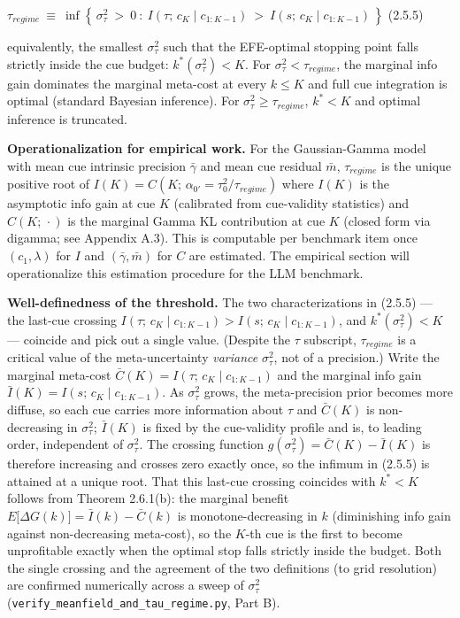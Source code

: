 \documentclass{article}
\begin{document}
\(\tau_{regime}\  \equiv \ \inf\left\{ \,\sigma_{\tau}^{2}\  > \ 0\ :\ I(\tau;\, c_{K} \mid c_{1:K - 1})\  > \ I(s;\, c_{K} \mid c_{1:K - 1})\, \right\}\)
(2.5.5)

equivalently, the smallest \(\sigma_{\tau}^{2}\) such that the
EFE-optimal stopping point falls strictly inside the cue budget:
\(k^{*}(\sigma_{\tau}^{2}) < K\). For
\(\sigma_{\tau}^{2} < \tau_{regime}\), the marginal info gain dominates
the marginal meta-cost at every \(k \leq K\) and full cue integration is
optimal (standard Bayesian inference). For
\(\sigma_{\tau}^{2} \geq \tau_{regime}\), \(k^{*} < K\) and optimal
inference is truncated.

\textbf{Operationalization for empirical work.} For the Gaussian-Gamma
model with mean cue intrinsic precision \(\bar{\gamma}\) and mean cue
residual \(\bar{m}\), \(\tau_{regime}\) is the unique positive root of
\(I(K) = C(K;\,\alpha_{0'} = \tau_{0}^{2}/\tau_{regime})\) where
\(I(K)\) is the asymptotic info gain at cue \(K\) (calibrated from
cue-validity statistics) and \(C(K;\, \cdot )\) is the marginal Gamma KL
contribution at cue \(K\) (closed form via digamma; see Appendix A.3).
This is computable per benchmark item once \((c_{1},\lambda)\) for \(I\)
and \((\bar{\gamma},\bar{m})\) for \(C\) are estimated. The empirical
section will operationalize this estimation procedure for the LLM
benchmark.

\textbf{Well-definedness of the threshold.} The two characterizations in
(2.5.5) --- the last-cue crossing
\(I(\tau;\, c_{K} \mid c_{1:K - 1}) > I(s;\, c_{K} \mid c_{1:K - 1})\),
and \(k^{*}(\sigma_{\tau}^{2}) < K\) --- coincide and pick out a single
value. (Despite the \(\tau\) subscript, \(\tau_{regime}\) is a critical
value of the meta-uncertainty \emph{variance} \(\sigma_{\tau}^{2}\), not
of a precision.) Write the marginal meta-cost
\(\bar{C}(K) = I(\tau;\, c_{K} \mid c_{1:K - 1})\) and the marginal info
gain \(\bar{I}(K) = I(s;\, c_{K} \mid c_{1:K - 1})\). As
\(\sigma_{\tau}^{2}\) grows, the meta-precision prior becomes more
diffuse, so each cue carries more information about \(\tau\) and
\(\bar{C}(K)\) is non-decreasing in \(\sigma_{\tau}^{2}\);
\(\bar{I}(K)\) is fixed by the cue-validity profile and is, to leading
order, independent of \(\sigma_{\tau}^{2}\). The crossing function
\(g(\sigma_{\tau}^{2}) = \bar{C}(K) - \bar{I}(K)\) is therefore
increasing and crosses zero exactly once, so the infimum in (2.5.5) is
attained at a unique root. That this last-cue crossing coincides with
\(k^{*} < K\) follows from Theorem 2.6.1(b): the marginal benefit
\(E\lbrack\Delta G(k)\rbrack = \bar{I}(k) - \bar{C}(k)\) is
monotone-decreasing in \(k\) (diminishing info gain against
non-decreasing meta-cost), so the \(K\)-th cue is the first to become
unprofitable exactly when the optimal stop falls strictly inside the
budget. Both the single crossing and the agreement of the two
definitions (to grid resolution) are confirmed numerically across a
sweep of \(\sigma_{\tau}^{2}\)
(\texttt{verify\_meanfield\_and\_tau\_regime.py}, Part B).
\end{document}

